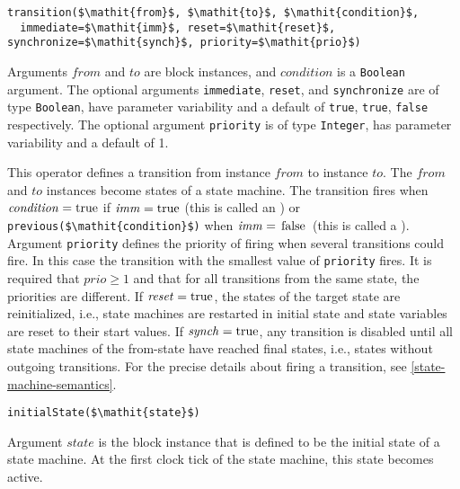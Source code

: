 \begin{operatordefinition}[transition]
\begin{synopsis}\begin{lstlisting}
transition($\mathit{from}$, $\mathit{to}$, $\mathit{condition}$,
  immediate=$\mathit{imm}$, reset=$\mathit{reset}$, synchronize=$\mathit{synch}$, priority=$\mathit{prio}$)
\end{lstlisting}\end{synopsis}
\begin{semantics}
Arguments $\mathit{from}$ and $\mathit{to}$ are block instances, and $\mathit{condition}$ is a \lstinline!Boolean! argument.
The optional arguments \lstinline!immediate!, \lstinline!reset!, and \lstinline!synchronize! are of type \lstinline!Boolean!, have parameter variability and a default of \lstinline!true!, \lstinline!true!, \lstinline!false! respectively.
The optional argument \lstinline!priority! is of type \lstinline!Integer!, has parameter variability and a default of 1.

This operator defines a transition from instance $\mathit{from}$ to instance $\mathit{to}$.
The $\mathit{from}$ and $\mathit{to}$ instances become states of a state machine.
The transition fires when $\mathit{condition} = \text{\lstinline!true!}$ if $\mathit{imm} = \text{\lstinline!true!}$ (this is called an ) or \lstinline!previous($\mathit{condition}$)! when $\mathit{imm} = \text{\lstinline!false!}$ (this is called a ).
Argument \lstinline!priority! defines the priority of firing when several transitions could fire.
In this case the transition with the smallest value of \lstinline!priority! fires.
It is required that $\mathit{prio} \geq 1$ and that for all transitions from the same state, the priorities are different.
If $\mathit{reset} = \text{\lstinline!true!}$, the states of the target state are reinitialized, i.e., state machines are restarted in initial state and state variables are reset to their start values.
If $\mathit{synch} = \text{\lstinline!true!}$, any transition is disabled until all state machines of the from-state have reached final states, i.e., states without outgoing transitions.
For the precise details about firing a transition, see \cref{state-machine-semantics}.
\end{semantics}
\end{operatordefinition}

\begin{operatordefinition}[initialState]
\begin{synopsis}\begin{lstlisting}
initialState($\mathit{state}$)
\end{lstlisting}\end{synopsis}
\begin{semantics}
Argument $\mathit{state}$ is the block instance that is defined to be the initial state of a state machine.
At the first clock tick of the state machine, this state becomes active.
\end{semantics}
\end{operatordefinition}

